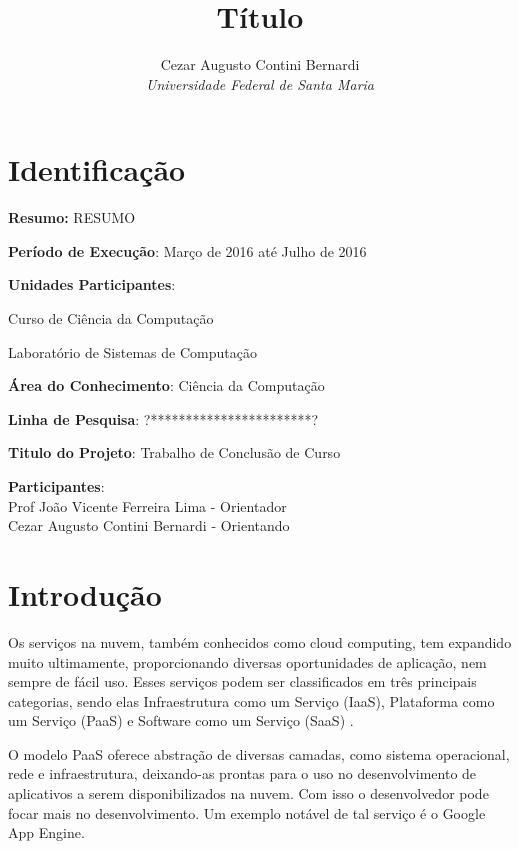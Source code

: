\documentclass[12pt]{article}
\title{Título}
\author{Cezar Augusto Contini Bernardi \\ \emph{Universidade Federal de Santa Maria}}
\begin{document}
\maketitle


\section{Identificação}

\begin{description} \itemsep 0pt

\item{\textbf{Resumo:}} RESUMO


\item{\textbf{Período de Execução}}: Março de 2016 até Julho de 2016

\item{\textbf{Unidades Participantes}}: 

    Curso de Ciência da Computação
    
    Laboratório de Sistemas de Computação
    
\item{\textbf{Área do Conhecimento}}: Ciência da Computação

\item{\textbf{Linha de Pesquisa}}: ?***********************?

\item{\textbf{Titulo do Projeto}}: Trabalho de Conclusão de Curso

\item{\textbf{Participantes}}:
\\Prof João Vicente Ferreira Lima - Orientador
\\Cezar Augusto Contini Bernardi - Orientando 
\end{description}


\section{Introdução}

Os serviços na nuvem, também conhecidos como cloud computing, tem expandido muito ultimamente, proporcionando diversas oportunidades de aplicação, nem sempre de fácil uso. Esses serviços podem ser classificados em três principais categorias, sendo elas Infraestrutura como um Serviço (IaaS), Plataforma como um Serviço (PaaS) e Software como um Serviço (SaaS) \cite{xaas}.

O modelo PaaS oferece abstração de diversas camadas, como sistema operacional, rede e infraestrutura, deixando-as prontas para o uso no desenvolvimento de aplicativos a serem disponibilizados na nuvem. Com isso o desenvolvedor pode focar mais no desenvolvimento. Um exemplo notável de tal serviço é o Google App Engine.
\end{document}

